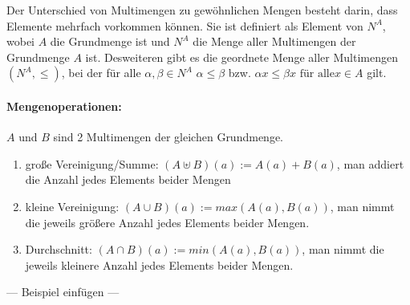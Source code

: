 Der Unterschied von Multimengen zu gewöhnlichen Mengen besteht darin,
dass Elemente mehrfach vorkommen können. Sie ist definiert als Element
von $N^A$, wobei $A$ die Grundmenge ist und $N^A$ die Menge aller
Multimengen der Grundmenge $A$ ist. Desweiteren gibt es die geordnete
Menge aller Multimengen $(N^A,\le)$, bei der für alle $\alpha, \beta
\in N^A$ $\alpha \le \beta$ bzw. $\alpha x \le \beta x \text{ für alle
} x \in A$ gilt.

\paragraph{Mengenoperationen:}
$A$ und $B$ sind 2 Multimengen der gleichen Grundmenge.
\begin{enumerate}
\item große Vereinigung/Summe: $(A \uplus B)(a) := A(a) + B(a)$, man
  addiert die Anzahl jedes Elements beider Mengen
\item kleine Vereinigung: $(A \cup B)(a) := max(A(a), B(a))$, man
  nimmt die jeweils größere Anzahl jedes Elements beider Mengen.
\item Durchschnitt: $(A \cap B)(a) := min(A(a), B(a))$, man nimmt die
  jeweils kleinere Anzahl jedes Elements beider Mengen.
\end{enumerate}

--- Beispiel einfügen ---

